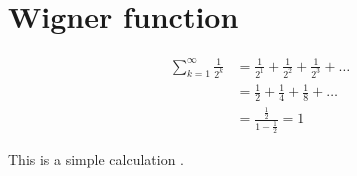 \documentclass{book}
\begin{document}
\section{Wigner function}

\begin{equation}
\begin{aligned}
  \sum_{k=1}^\infty \frac 1 {2^k} &= \frac 1 {2^1} + \frac 1 {2^2} + \frac 1 {2^3} + \dots \\
  &= \frac{1}{2} + \frac{1}{4} + \frac{1}{8} + \dots \\
  &= \frac{\frac 1 2}{1-\frac 1 2} =  1
\end{aligned}
\end{equation}

This is a simple calculation \cite{adams1995hitchhiker}.

\printindex



\end{document}
